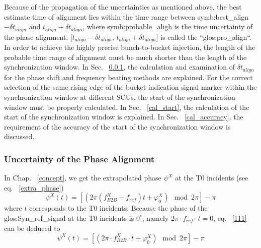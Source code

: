 Because of the propagation of the uncertainties as mentioned above, the best estimate time of alignment lies within the time range between \gls{symb:best_align}$-\delta t_\mathit{align}$ and $t_\mathit{align}+\delta t_\mathit{align}$, where \gls{symb:probable_aligh} is the time uncertainty of the phase alignment. [$t_\mathit{align}-\delta t_\mathit{align}$, $t_\mathit{align}+\delta t_\mathit{align}$] is called the ``\gls{glos:pro_align}``. In order to achieve the highly precise bunch-to-bucket injection, the length of the probable time range of alignment must be much shorter than the length of the synchronization window. In Sec. ~\ref{cal_align}, the calculation and examination of $\delta t_\mathit{align}$ for the phase shift and frequency beating methods are explained. For the correct selection of the same rising edge of the bucket indication signal marker within the synchronization window at different SCUs, the start of the synchronization window must be properly calculated. In Sec.  ~\ref{cal_start}, the calculation of the start of the synchronization window is explained. In Sec.  ~\ref{cal_accuracy}, the requirement of the accuracy of the start of the synchronization window is discussed. 

\subsubsection{Uncertainty of the Phase Alignment}
\label{cal_align}

In Chap. ~\ref{concept}, we get the extrapolated phase $\psi^\mathit{X}$ at the T0 incidents (see eq. ~\ref{extra_phase}) 
\begin{equation}
\label{111}
\psi^\mathit{X}(t)=[(2\pi(f_\mathit{B2B}^{X}-f_\mathit{ref})t+\varphi^X_0) \mod 2\pi] - \pi
\end{equation}
where $t$ corresponds to the T0 incidents. Because the phase of the \gls{glos:Syn_ref_signal} at the T0 incidents is $0^\circ$, namely $2\pi\cdot f_\mathit{ref}\cdot t=0$, eq. ~\ref{111} can be deduced to 
\begin{equation}
\label{222}
\psi^\mathit{X}(t)=[(2\pi\cdot f_\mathit{B2B}^{X} \cdot t+\varphi^X_0) \mod 2\pi] - \pi
\end{equation}

